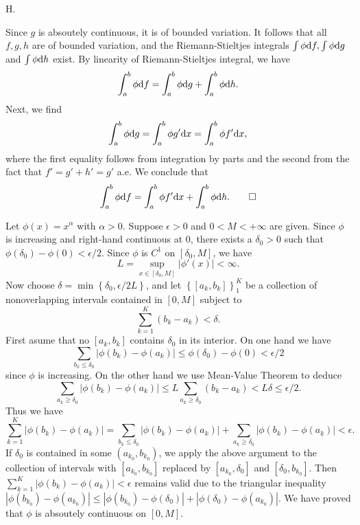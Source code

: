 
\begin{exercise}{7.4}
  H.
\end{exercise}

\begin{exercise}{7.5}
  Since $g$ is absoutely continuous,
  it is of bounded variation.
  It follows that all $f, g, h$ are of bounded variation,
  and the Riemann-Stieltjes integrals
  $\int \phi \mathrm{d} f, \int \phi \mathrm{d} g$ and $\int \phi \mathrm{d} h$ exist.
  By linearity of Riemann-Stieltjes integral, we have
  \[
    \int_a^b \phi \mathrm{d} f = \int_a^b \phi \mathrm{d} g + \int_a^b \phi \mathrm{d} h.
  \]
  Next, we find
  \[
    \int_a^b \phi \mathrm{d} g = \int_a^b \phi g' \mathrm{d} x
    = \int_a^b \phi f' \mathrm{d} x,
  \]
  where the first equality follows from integration by parts
  and the second from the fact that $f' = g' + h' = g'$ a.e.
  We conclude that
  \[
    \int_a^b \phi \mathrm{d} f = \int_a^b \phi f' \mathrm{d} x + \int_a^b \phi \mathrm{d} h.
    \qedhere
  \]
\end{exercise}

\begin{exercise}{7.6}
  Let $\phi(x) = x^{\alpha}$ with $\alpha > 0$.
  Suppose $\epsilon > 0$ and $0 < M < +\infty$ are given.
  Since $\phi$ is increasing and right-hand continuous at $0$,
  there exists a $\delta_0 > 0$ such that
  $\phi(\delta_0) - \phi(0) < \epsilon/2$.
  Since $\phi$ is $C^1$ on $[\delta_0, M]$,
  we have
  \[
    L = \sup_{x \in [\delta_0, M]} \left| \phi'(x) \right| < \infty.
  \]
  Now choose $\delta = \min \left\{ \delta_0, {\epsilon}/{2 L} \right\}$,
  and let $\left\{ [a_k, b_k] \right\}_1^K$ be a collection of
  nonoverlapping intervals contained in $[0, M]$ subject to
  \[
    \sum_{k=1}^K \left(b_k - a_k\right) < \delta.
  \]
  First asume that no $[a_k, b_k]$ contains $\delta_0$ in its interior.
  On one hand we have
  \[
    \sum_{b_k \le \delta_0} \left| \phi(b_k) - \phi(a_k) \right|
    \le \phi(\delta_0) - \phi(0) < \epsilon/2
  \]
  since $\phi$ is increasing.
  On the other hand we use Mean-Value Theorem to deduce
  \[
    \sum_{a_k \ge \delta_0} \vert \phi(b_k) - \phi(a_k) \vert
    \le L \sum_{a_k \ge \delta_0} \left( b_k - a_k \right)
    < L \delta \le \epsilon/2.
  \]
  Thus we have
  \[
    \sum_{k=1}^K \left| \phi(b_k) - \phi(a_k) \right|
    = \sum_{b_k \le \delta_0} \left| \phi(b_k) - \phi(a_k) \right|
    + \sum_{a_k \ge \delta_0} \left| \phi(b_k) - \phi(a_k) \right|
    < \epsilon.
  \]
  If $\delta_0$ is contained in some $(a_{k_0}, b_{k_0})$,
  we apply the above argument to the collection of intervals
  with $[a_{k_0}, b_{k_0}]$ replaced by
  $[a_{k_0}, \delta_0]$ and $[\delta_0, b_{k_0}]$.
  Then $\sum_{k=1}^K \left| \phi(b_k) - \phi(a_k) \right| < \epsilon$
  remains valid due to the triangular inequality
  $|\phi(b_{k_0}) - \phi(a_{k_0})| \le
  |\phi(b_{k_0}) - \phi(\delta_0)| + |\phi(\delta_0) - \phi(a_{k_0})|$.
  We have proved that $\phi$ is absoutely continuous on $[0, M]$.
\end{exercise}

